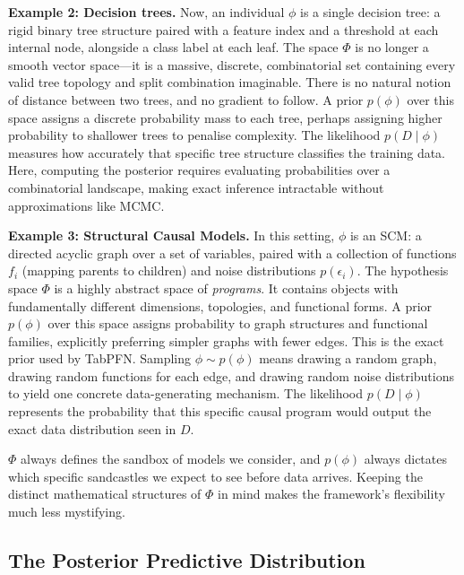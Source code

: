 \documentclass[12pt]{article}
\begin{document}
\medskip
\noindent\textbf{Example 2: Decision trees.}
Now, an individual $\phi$ is a single decision tree: a rigid binary tree structure paired with a feature index and a threshold at each internal node, alongside a class label at each leaf. The space $\Phi$ is no longer a smooth vector space—it is a massive, discrete, combinatorial set containing every valid tree topology and split combination imaginable. There is no natural notion of distance between two trees, and no gradient to follow. A prior $p(\phi)$ over this space assigns a discrete probability mass to each tree, perhaps assigning higher probability to shallower trees to penalise complexity. The likelihood $p(D \mid \phi)$ measures how accurately that specific tree structure classifies the training data. Here, computing the posterior requires evaluating probabilities over a combinatorial landscape, making exact inference intractable without approximations like MCMC.

\medskip
\noindent\textbf{Example 3: Structural Causal Models.}
In this setting, $\phi$ is an SCM: a directed acyclic graph over a set of variables, paired with a collection of functions $f_i$ (mapping parents to children) and noise distributions $p(\epsilon_i)$. The hypothesis space $\Phi$ is a highly abstract space of \emph{programs}. It contains objects with fundamentally different dimensions, topologies, and functional forms. A prior $p(\phi)$ over this space assigns probability to graph structures and functional families, explicitly preferring simpler graphs with fewer edges. This is the exact prior used by TabPFN. Sampling $\phi \sim p(\phi)$ means drawing a random graph, drawing random functions for each edge, and drawing random noise distributions to yield one concrete data-generating mechanism. The likelihood $p(D \mid \phi)$ represents the probability that this specific causal program would output the exact data distribution seen in $D$. 

\medskip
{} $\Phi$ always defines the sandbox of models we consider, and $p(\phi)$ always dictates which specific sandcastles we expect to see before data arrives. Keeping the distinct mathematical structures of $\Phi$ in mind makes the framework's flexibility much less mystifying.

\subsection{The Posterior Predictive Distribution}
\end{document}
